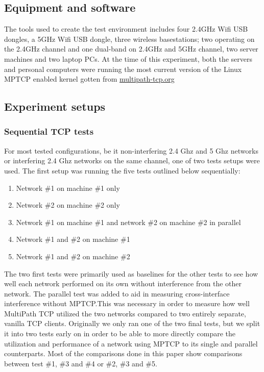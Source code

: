\subsection{Equipment and software}
The tools used to create the test environment includes four 2.4GHz Wifi USB
dongles, a 5GHz Wifi USB dongle, three wireless basestations; two operating on
the 2.4GHz channel and one dual-band on 2.4GHz and  5GHz channel, two server
machines and two laptop PCs. At the time of this experiment, both the servers
and personal computers were running the most current version of the Linux MPTCP
enabled kernel gotten from \href{http://multipath-tcp.org/}{multipath-tcp.org}

\subsection{Experiment setups}
\subsubsection{Sequential TCP tests}
For most tested configurations, be it non-interfering 2.4 Ghz and 5 Ghz networks
or interfering 2.4 Ghz networks on the same channel, one of two tests setups
were used. The first setup was running the five tests outlined below
sequentially:

\begin{enumerate}
  \item Network \#1 on machine \#1 only
  \item Network \#2 on machine \#2 only
  \item Network \#1 on machine \#1 and network \#2 on machine \#2 in parallel
  \item Network \#1 and \#2 on machine \#1
  \item Network \#1 and \#2 on machine \#2
\end{enumerate}

The two first tests were primarily used as baselines for the other tests to see
how well each network performed on its own without interference from the other
network. The parallel test was added to aid in measuring cross-interface
interference without MPTCP.\@ This was necessary in order to measure how well
MultiPath TCP utilized the two networks compared to two entirely separate,
vanilla TCP clients. Originally we only ran one of the two final tests, but we
split it into two tests early on in order to be able to more directly compare
the utilization and performance of a network using MPTCP to its single and
parallel counterparts. Most of the comparisons done in this paper show
comparisons between test \#1, \#3 and \#4 or \#2, \#3 and \#5.

